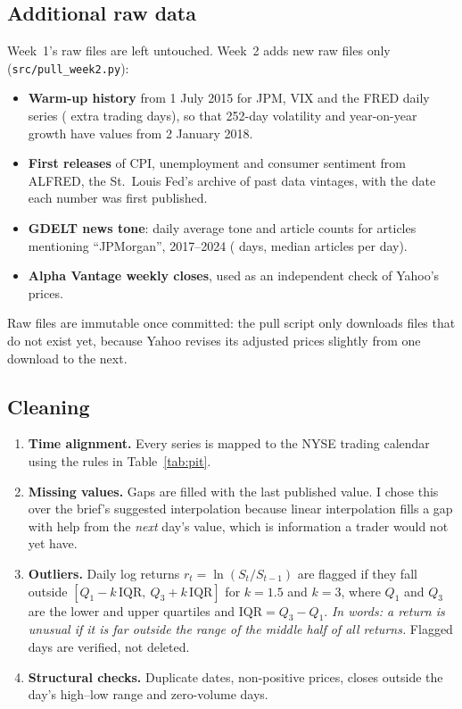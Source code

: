 \documentclass[11pt]{article}
\newcommand{\code}[1]{\texttt{#1}}
\begin{document}
\subsection{Additional raw data}
Week~1's raw files are left untouched. Week~2 adds new raw files only (\code{src/pull\_week2.py}):
\begin{itemize}
  \item \textbf{Warm-up history} from 1 July 2015 for JPM, VIX and the FRED daily series (\wWarmuprows{} extra trading
        days), so that 252-day volatility and year-on-year growth have values from 2 January 2018.
  \item \textbf{First releases} of CPI, unemployment and consumer sentiment from ALFRED, the St.~Louis Fed's archive
        of past data vintages, with the date each number was first published.
  \item \textbf{GDELT news tone}: daily average tone and article counts for articles mentioning ``JPMorgan'',
        2017--2024 (\wGdeltdays{} days, median \wGdeltarticlesmedian{} articles per day).
  \item \textbf{Alpha Vantage weekly closes}, used as an independent check of Yahoo's prices.
\end{itemize}
Raw files are immutable once committed: the pull script only downloads files that do not exist yet, because Yahoo
revises its adjusted prices slightly from one download to the next.

\subsection{Cleaning}
\begin{enumerate}
  \item \textbf{Time alignment.} Every series is mapped to the NYSE trading calendar using the rules in
        Table~\ref{tab:pit}.
  \item \textbf{Missing values.} Gaps are filled with the last published value. I chose this over the brief's
        suggested interpolation because linear interpolation fills a gap with help from the \emph{next} day's value,
        which is information a trader would not yet have.
  \item \textbf{Outliers.} Daily log returns $r_t=\ln(S_t/S_{t-1})$ are flagged if they fall outside
        $[Q_1 - k\,\mathrm{IQR},\ Q_3 + k\,\mathrm{IQR}]$ for $k = 1.5$ and $k = 3$, where $Q_1$ and $Q_3$ are the
        lower and upper quartiles and $\mathrm{IQR}=Q_3-Q_1$. \emph{In words: a return is unusual if it is far outside
        the range of the middle half of all returns.} Flagged days are verified, not deleted.
  \item \textbf{Structural checks.} Duplicate dates, non-positive prices, closes outside the day's high--low range
        and zero-volume days.
\end{enumerate}
\end{document}
